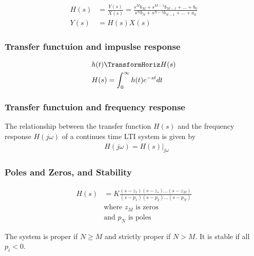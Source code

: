 
\begin{align*}
    H(s) &= \frac{Y(s)}{X(s)}=\frac{s^{M}b_M + s^{M-1}b_{M-1} + \ldots + b_0}{s^{N}b_N + s^{N-1}b_{N-1} + \ldots + a_0} \\
    Y(s) &= H(s)X(s)
\end{align*}

\subsubsection{Transfer functuion and impuslse response}
\begin{align*}
    &h(t) \TransformHoriz H(s) \\
    &H(s) = \int_{0}^{\infty} h(t)e^{-st}dt
\end{align*}

\subsubsection{Transfer functuion and frequency response}
The relationship between the transfer function $H(s)$ and the frequency response 
$H(j\omega)$ of a continues time LTI system is given by 
\begin{align*}
    &H(j\omega) = H(s)|_{j\omega}
\end{align*}

\subsubsection{Poles and Zeros, and Stability}

\begin{align*}
    H(s) &= K\frac{(s-z_1)(s-z_s)\ldots(s-z_M)}{(s-p_1)(s-p_2)\ldots(s-p_N)} \\
    &\text{where $z_M$ is zeros} \\
    &\text{and $p_N$ is poles}
\end{align*}

The system is proper if $N\geq M$ and strictly proper if $N>M$. 
It is stable if all $p_i<0$.  \newline

